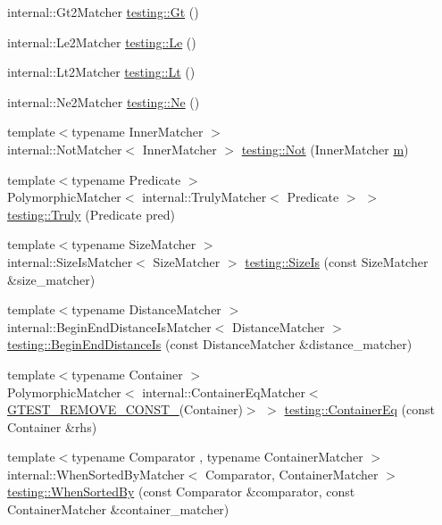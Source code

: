 \begin{DoxyCompactItemize}
internal\+::\+Gt2\+Matcher \hyperlink{namespacetesting_a3eaae6408f77ba7d87ca2d6a21dbde77}{testing\+::\+Gt} ()
\item 
internal\+::\+Le2\+Matcher \hyperlink{namespacetesting_a04def1c627ea7e3fce2f08cb06e83ebc}{testing\+::\+Le} ()
\item 
internal\+::\+Lt2\+Matcher \hyperlink{namespacetesting_a3b4d6d29d715c1bf219163f5206b53d4}{testing\+::\+Lt} ()
\item 
internal\+::\+Ne2\+Matcher \hyperlink{namespacetesting_a0cde8994764617eebc751e682c28d4ae}{testing\+::\+Ne} ()
\item 
{\footnotesize template$<$typename Inner\+Matcher $>$ }\\internal\+::\+Not\+Matcher$<$ Inner\+Matcher $>$ \hyperlink{namespacetesting_a3d7d0dda7e51b13fe2f5aa28e23ed6b6}{testing\+::\+Not} (Inner\+Matcher \hyperlink{app_2main_8cpp_a0d2d8836216fc94b61aa0824eb239db2}{m})
\item 
{\footnotesize template$<$typename Predicate $>$ }\\Polymorphic\+Matcher$<$ internal\+::\+Truly\+Matcher$<$ Predicate $>$ $>$ \hyperlink{namespacetesting_a5faf05cfaae6074439960048e478b1c8}{testing\+::\+Truly} (Predicate pred)
\item 
{\footnotesize template$<$typename Size\+Matcher $>$ }\\internal\+::\+Size\+Is\+Matcher$<$ Size\+Matcher $>$ \hyperlink{namespacetesting_acd5e215558f95f1393c048a6d496060d}{testing\+::\+Size\+Is} (const Size\+Matcher \&size\+\_\+matcher)
\item 
{\footnotesize template$<$typename Distance\+Matcher $>$ }\\internal\+::\+Begin\+End\+Distance\+Is\+Matcher$<$ Distance\+Matcher $>$ \hyperlink{namespacetesting_a122739b5b6bd9f993f26800dafdb4cc3}{testing\+::\+Begin\+End\+Distance\+Is} (const Distance\+Matcher \&distance\+\_\+matcher)
\item 
{\footnotesize template$<$typename Container $>$ }\\Polymorphic\+Matcher$<$ internal\+::\+Container\+Eq\+Matcher$<$ \hyperlink{gtest-internal_8h_a2ffec8c60510eb130af387f5ce9a756a}{G\+T\+E\+S\+T\+\_\+\+R\+E\+M\+O\+V\+E\+\_\+\+C\+O\+N\+S\+T\+\_\+}(Container)$>$ $>$ \hyperlink{namespacetesting_a5928ffc4e976a4da981512c422792840}{testing\+::\+Container\+Eq} (const Container \&rhs)
\item 
{\footnotesize template$<$typename Comparator , typename Container\+Matcher $>$ }\\internal\+::\+When\+Sorted\+By\+Matcher$<$ Comparator, Container\+Matcher $>$ \hyperlink{namespacetesting_af74dfcde9ed88d79cf69dfda049078a3}{testing\+::\+When\+Sorted\+By} (const Comparator \&comparator, const Container\+Matcher \&container\+\_\+matcher)

\end{DoxyCompactItemize}
